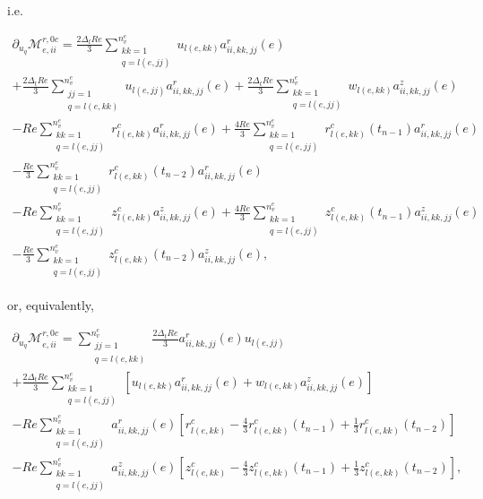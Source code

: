 \documentclass{article}
\begin{document}
i.e.

\begin{equation}
\begin{array}{l} \partial_{u_q} \mathcal{M}_{e,ii}^{r,0c} = \frac{2\Delta_t Re}{3} \sum_{\substack{kk=1 \\ q=l(e,jj)}}^{n_v^e} u_{l(e,kk)} a_{ii,kk,jj}^r(e) \\ + \frac{2\Delta_t Re}{3} \sum_{\substack{jj=1 \\ q=l(e,kk)}}^{n_v^e} u_{l(e,jj)} a_{ii,kk,jj}^r(e) + \frac{2\Delta_t Re}{3} \sum_{\substack{kk=1 \\ q=l(e,jj)}}^{n_v^e} w_{l(e,kk)} a_{ii,kk,jj}^z(e) \\ - Re \sum_{\substack{kk=1 \\ q=l(e,jj)}}^{n_v^e} r_{l(e,kk)}^c a_{ii,kk,jj}^r(e) + \frac{4Re}{3} \sum_{\substack{kk=1 \\ q=l(e,jj)}}^{n_v^e} r_{l(e,kk)}^c(t_{n-1}) a_{ii,kk,jj}^r(e) \\ - \frac{Re}{3} \sum_{\substack{kk=1 \\ q=l(e,jj)}}^{n_v^e} r_{l(e,kk)}^c(t_{n-2}) a_{ii,kk,jj}^r(e) \\ - Re \sum_{\substack{kk=1 \\ q=l(e,jj)}}^{n_v^e} z_{l(e,kk)}^c a_{ii,kk,jj}^z(e) + \frac{4Re}{3} \sum_{\substack{kk=1 \\ q=l(e,jj)}}^{n_v^e} z_{l(e,kk)}^c(t_{n-1}) a_{ii,kk,jj}^z(e) \\ - \frac{Re}{3} \sum_{\substack{kk=1 \\ q=l(e,jj)}}^{n_v^e} z_{l(e,kk)}^c(t_{n-2}) a_{ii,kk,jj}^z(e), \end{array} \tag{4.163}
\end{equation}

or, equivalently,

\begin{equation}
\begin{array}{l} \partial_{u_q} \mathcal{M}_{e,ii}^{r,0c} = \sum_{\substack{jj=1 \\ q=l(e,kk)}}^{n_v^e} \frac{2\Delta_t Re}{3} a_{ii,kk,jj}^r(e) u_{l(e,jj)} \\ + \frac{2\Delta_t Re}{3} \sum_{\substack{kk=1 \\ q=l(e,jj)}}^{n_v^e} \left[ u_{l(e,kk)} a_{ii,kk,jj}^r(e) + w_{l(e,kk)} a_{ii,kk,jj}^z(e) \right] \\ - Re \sum_{\substack{kk=1 \\ q=l(e,jj)}}^{n_v^e} a_{ii,kk,jj}^r(e) \left[ r_{l(e,kk)}^c - \frac{4}{3} r_{l(e,kk)}^c(t_{n-1}) + \frac{1}{3} r_{l(e,kk)}^c(t_{n-2}) \right] \\ - Re \sum_{\substack{kk=1 \\ q=l(e,jj)}}^{n_v^e} a_{ii,kk,jj}^z(e) \left[ z_{l(e,kk)}^c - \frac{4}{3} z_{l(e,kk)}^c(t_{n-1}) + \frac{1}{3} z_{l(e,kk)}^c(t_{n-2}) \right], \end{array} \tag{4.164}
\end{equation}
\end{document}
